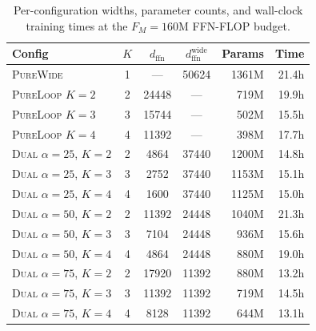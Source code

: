 \documentclass[11pt]{article}
\begin{document}
\begin{table}[h]
\centering
\small
\setlength{\tabcolsep}{4pt}
\renewcommand{\arraystretch}{1.05}
\begin{tabular}{lcccrr}
\toprule
Config & $K$ & $d_{\text{ffn}}$ & $d_{\text{ffn}}^{\text{wide}}$ & Params & Time \\
\midrule
\textsc{PureWide}                       & 1 & ---   & 50624 & 1361M & 21.4h \\
\textsc{PureLoop} $K{=}2$               & 2 & 24448 & ---   &  719M & 19.9h \\
\textsc{PureLoop} $K{=}3$               & 3 & 15744 & ---   &  502M & 15.5h \\
\textsc{PureLoop} $K{=}4$               & 4 & 11392 & ---   &  398M & 17.7h \\
\midrule
\textsc{Dual} $\alpha{=}25$, $K{=}2$    & 2 &  4864 & 37440 & 1200M & 14.8h \\
\textsc{Dual} $\alpha{=}25$, $K{=}3$    & 3 &  2752 & 37440 & 1153M & 15.1h \\
\textsc{Dual} $\alpha{=}25$, $K{=}4$    & 4 &  1600 & 37440 & 1125M & 15.0h \\
\textsc{Dual} $\alpha{=}50$, $K{=}2$    & 2 & 11392 & 24448 & 1040M & 21.3h \\
\textsc{Dual} $\alpha{=}50$, $K{=}3$    & 3 &  7104 & 24448 &  936M & 15.6h \\
\textsc{Dual} $\alpha{=}50$, $K{=}4$    & 4 &  4864 & 24448 &  880M & 19.0h \\
\textsc{Dual} $\alpha{=}75$, $K{=}2$    & 2 & 17920 & 11392 &  880M & 13.2h \\
\textsc{Dual} $\alpha{=}75$, $K{=}3$    & 3 & 11392 & 11392 &  719M & 14.5h \\
\textsc{Dual} $\alpha{=}75$, $K{=}4$    & 4 &  8128 & 11392 &  644M & 13.1h \\
\bottomrule
\end{tabular}
\caption{Per-configuration widths, parameter counts, and
wall-clock training times at the $F_M = 160$M FFN-FLOP budget.}
\label{tab:configs-f160m}
\end{table}
\end{document}
